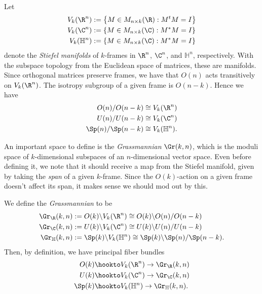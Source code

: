 \documentclass[11pt]{book}
\begin{document}
\begin{example} Let
\begin{align*}
    V_k(\R^n) & := \left\{ M \in M_{n \times k}(\R) : M^t M = I \right\} \\
    V_k(\C^n) & := \left\{ M \in M_{n \times k}(\C) : M^\ast M = I \right\} \\
    V_k(\mathbb{H}^n) & := \left\{ M \in M_{n \times k}(\C) : M^\ast M = I \right\}
\end{align*}
denote the \emph{Stiefel manifolds} of $k$-frames in $\R^n$,  $\C^n$, and $\mathbb{H}^n$, respectively. With the subspace topology from the Euclidean space of matrices, these are manifolds. Since orthogonal matrices preserve frames, we have that $O(n)$ acts transitively on $V_k(\R^n)$. The isotropy subgroup of a given frame is $O(n-k)$. Hence we have
\begin{align*}
    O(n)/O(n-k) &\cong V_k(\R^n) \\
    U(n)/U(n-k) &\cong V_k(\C^n) \\
    \Sp(n)/\Sp(n-k) &\cong V_k(\mathbb{H}^n).
\end{align*}
\end{example}

An important space to define is the \emph{Grassmannian} $\Gr(k,n)$, which is the moduli space of $k$-dimensional subspaces of an $n$-dimensional vector space. Even before defining it, we note that it should receive a map from the Stiefel manifold, given by taking the \emph{span} of a given $k$-frame. Since the $O(k)$-action on a given frame doesn't affect its span, it makes sense we should mod out by this.

\begin{definition}\label{def:Grassmannian}
We define the \emph{Grassmannian} to be
\begin{align*}
    \Gr_\R(k,n) & := O(k)\backslash V_k(\R^n) \cong O(k)\backslash O(n)/O(n-k) \\
    \Gr_\C(k,n) & := U(k) \backslash V_k(\C^n) \cong U(k) \backslash U(n)/U(n-k) \\
    \Gr_{\mathbb{H}}(k,n) & := \Sp(k) \backslash V_k(\mathbb{H}^n) \cong \Sp(k)\backslash \Sp(n)/\Sp(n-k).
\end{align*}
Then, by definition, we have principal fiber bundles
\begin{align*}
    O(k) \hookto & V_k(\R^n) \to \Gr_\R(k,n) \\
    U(k) \hookto & V_k(\C^n) \to \Gr_\C(k,n) \\
    \Sp(k) \hookto & V_k(\mathbb{H}^n) \to \Gr_{\mathbb{H}}(k,n).
\end{align*}
\end{definition}
\end{document}
